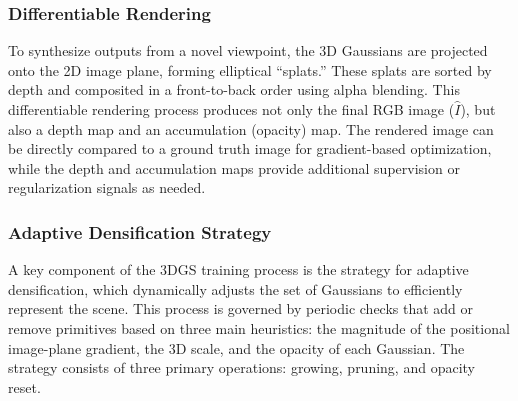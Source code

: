 \subsubsection{Differentiable Rendering}
To synthesize outputs from a novel viewpoint, the 3D Gaussians are projected onto the 2D image plane, forming elliptical ``splats.'' These splats are sorted by depth and composited in a front-to-back order using alpha blending. This differentiable rendering process produces not only the final RGB image ($\hat{I}$), but also a depth map and an accumulation (opacity) map. The rendered image can be directly compared to a ground truth image for gradient-based optimization, while the depth and accumulation maps provide additional supervision or regularization signals as needed.

\subsubsection{Adaptive Densification Strategy}
A key component of the 3DGS training process is the strategy for adaptive densification, which dynamically adjusts the set of Gaussians to efficiently represent the scene. This process is governed by periodic checks that add or remove primitives based on three main heuristics: the magnitude of the positional image-plane gradient, the 3D scale, and the opacity of each Gaussian. The strategy consists of three primary operations: growing, pruning, and opacity reset.

